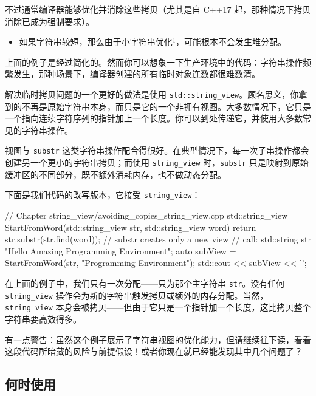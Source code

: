 不过通常编译器能够优化并消除这些拷贝（尤其是自 C++17 起，那种情况下拷贝消除已成为强制要求）。

\begin{itemize}
\item 如果字符串较短，那么由于小字符串优化¹，可能根本不会发生堆分配。
\end{itemize}

上面的例子是经过简化的。然而你可以想象一下生产环境中的代码：字符串操作频繁发生，那种场景下，编译器创建的所有临时对象连数都很难数清。

解决临时拷贝问题的一个更好的做法是使用 \texttt{std::string\_view}。顾名思义，你拿到的不再是原始字符串本身，而只是它的一个非拥有视图。大多数情况下，它只是一个指向连续字符序列的指针加上一个长度。你可以到处传递它，并使用大多数常见的字符串操作。

视图与 \texttt{substr} 这类字符串操作配合得很好。在典型情况下，每一次子串操作都会创建另一个更小的字符串拷贝；而使用 \texttt{string\_view} 时，\texttt{substr} 只是映射到原始缓冲区的不同部分，既不额外消耗内存，也不做动态分配。

下面是我们代码的改写版本，它接受 \texttt{string\_view}：


\begin{codebox}[cpp]
// Chapter string_view/avoiding_copies_string_view.cpp
std::string_view StartFromWord(std::string_view str, std::string_view word)
{
return str.substr(str.find(word)); // substr creates only a new view
}
// call:
std::string str {"Hello Amazing Programming Environment"};
auto subView = StartFromWord(str, "Programming Environment");
std::cout << subView << '\n';
\end{codebox}

在上面的例子中，我们只有一次分配——只为那个主字符串 \texttt{str}。没有任何 \texttt{string\_view} 操作会为新的字符串触发拷贝或额外的内存分配。当然，\texttt{string\_view} 本身会被拷贝——但由于它只是一个指针加一个长度，这比拷贝整个字符串要高效得多。

有一点警告：虽然这个例子展示了字符串视图的优化能力，但请继续往下读，看看这段代码所暗藏的风险与前提假设！或者你现在就已经能发现其中几个问题了？

\subsection{何时使用}

